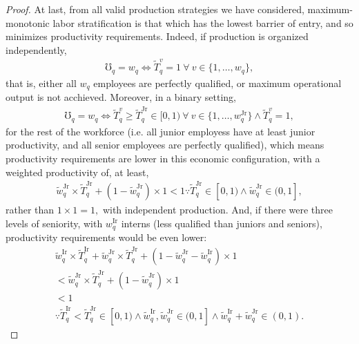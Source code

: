\documentclass[hidelinks, nonatbib]{elsarticle}
\begin{document}
\begin{lemma}
\begin{proof}
        At last, from all valid production strategies we have considered, maximum-monotonic labor stratification is that which has the lowest barrier of entry, and so minimizes productivity requirements. Indeed, if production is organized independently,
        \begin{gather}
        \mho_q = w_q
        \iff
        \tilde{T}_{q}^{v}
        =
        1
        \
        \forall
        \
        v \in \{1, \dots, w_q\}
        ,
        \end{gather}
        that is, either all $w_q$ employees are perfectly qualified, or maximum operational output is not acchieved. Moreover, in a binary setting,
        \begin{gather}
        \mho_q = w_q
        \iff
        \tilde{T}_{q}^{v}
        \geq
        \tilde{T}_{q}^{\text{Jr}}
        \in
        [0,1)
        \
        \forall
        \
        v \in \{1, \dots, w_{q}^{\text{Jr}}\}
        \land
        \tilde{T}_{q}^{v}
        =
        1
        ,
        \end{gather}
        for the rest of the workforce (i.e. all junior employess have at least junior productivity, and all senior employees are perfectly qualified), which means productivity requirements are lower in this economic configuration, with a weighted productivity of, at least,
        \begin{gather}
        \tilde{w}_{q}^{\text{Jr}}
        \times
        \tilde{T}_{q}^{\text{Jr}}
        +
        (
            1 - \tilde{w}_{q}^{\text{Jr}}
        )
        \times
        1
        <
        1
        \because
        \tilde{T}_{q}^{\text{Jr}}
        \in
        [0,1)
        \land
        \tilde{w}_{q}^{\text{Jr}}
        \in
        (0,1]
        ,
        \end{gather}
        rather than $1 \times 1 = 1,$ with independent production. And, if there were three levels of seniority, with $w_{q}^{\text{Ir}}$ interns (less qualified than juniors and seniors), productivity requirements would be even lower:
        \begin{align}
        \tilde{w}_{q}^{\text{Ir}}
        \times
        \tilde{T}_{q}^{\text{Ir}}
        +
        \tilde{w}_{q}^{\text{Jr}}
        \times
        \tilde{T}_{q}^{\text{Jr}}
        +
        (
            1 - \tilde{w}_{q}^{\text{Jr}} - \tilde{w}_{q}^{\text{Ir}}
        )
        \times
        1
        \\
        <
        \tilde{w}_{q}^{\text{Jr}}
        \times
        \tilde{T}_{q}^{\text{Jr}}
        +
        (
            1 - \tilde{w}_{q}^{\text{Jr}}
        )
        \times
        1
        \\
        <
        1
        \\
        \because
        \tilde{T}_{q}^{\text{Ir}}
        <
        \tilde{T}_{q}^{\text{Jr}}
        \in
        [0,1)
        \land
        \tilde{w}_{q}^{\text{Ir}},
        \tilde{w}_{q}^{\text{Jr}}
        \in
        (0,1]
        \land
        \tilde{w}_{q}^{\text{Ir}}
        +
        \tilde{w}_{q}^{\text{Jr}}
        \in
        (0,1)
        .
        \end{align}
        

\end{proof}
\end{lemma}
\end{document}

